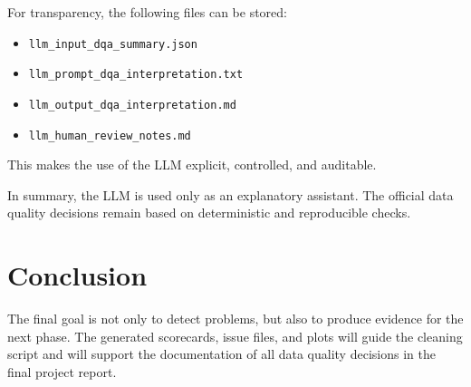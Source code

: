 \documentclass[a4paper,11pt]{article}
\begin{document}
	For transparency, the following files can be stored:
	
	\begin{itemize}
		\item \texttt{llm\_input\_dqa\_summary.json}
		\item \texttt{llm\_prompt\_dqa\_interpretation.txt}
		\item \texttt{llm\_output\_dqa\_interpretation.md}
		\item \texttt{llm\_human\_review\_notes.md}
	\end{itemize}
	
	This makes the use of the LLM explicit, controlled, and auditable.
	
	In summary, the LLM is used only as an explanatory assistant. The official data quality
	decisions remain based on deterministic and reproducible checks.
	\section{Conclusion}
	

	The final goal is not only to detect problems, but also to produce evidence for the next phase.
	The generated scorecards, issue files, and plots will guide the cleaning script and will support the documentation of all data quality decisions in the final project report.
	
\end{document}
